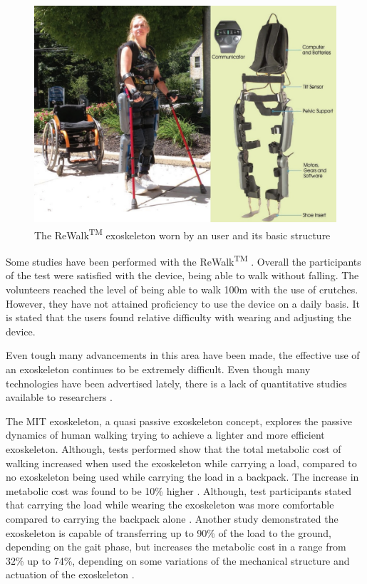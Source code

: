    \begin{figure}[thpb]
      \centering
      \includegraphics[scale=0.5]{Images/ReWalk.jpg}
      \caption{The ReWalk\textsuperscript{TM} exoskeleton worn by an user and its basic structure \cite{Esquenazi2013}}
      \label{ReWalk}
   \end{figure}
   
   Some studies have been performed with the ReWalk\textsuperscript{TM} \cite{Zeilig2012} \cite{Fineberg2013} \cite{Talaty6650469}. Overall the participants of the test were satisfied with the device, being able to walk without falling. The volunteers reached the level of being able to walk 100m with the use of crutches. However, they have not attained proficiency to use the device on a daily basis. It is stated that the users found relative difficulty with wearing and adjusting the device.   
   
   Even tough many advancements in this area have been made, the effective use of an exoskeleton continues to be extremely difficult. Even though many technologies have been advertised lately, there is a lack of quantitative studies available to researchers \cite{Young7393837}.
   
   The MIT exoskeleton, a quasi passive exoskeleton concept, explores the passive dynamics of human walking trying to achieve a lighter and more efficient exoskeleton. Although, tests performed show that the total metabolic cost of walking increased when used the exoskeleton while carrying a load, compared to no exoskeleton being used while carrying the load in a backpack. The increase in metabolic cost was found to be 10\% higher  \cite{Walsh2007}. Although, test participants stated that carrying the load while wearing the exoskeleton was more comfortable compared to carrying the backpack alone \cite{Valiente2005}. Another study demonstrated the exoskeleton is capable of transferring up to 90\% of the load to the ground, depending on the gait phase, but increases the metabolic cost in a range from 32\% up to 74\%, depending on some variations of the mechanical structure and actuation of the exoskeleton \cite{Walsh2006}.
   
